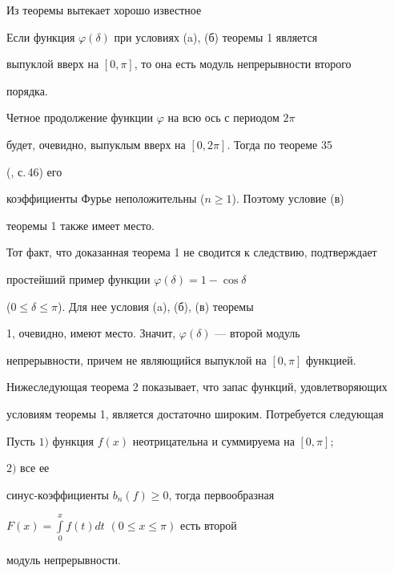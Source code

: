  


Из теоремы вытекает хорошо известное 


 


\begin{cornonum} 


Если функция $\varphi(\delta)$ при условиях (a), (б) теоремы 1 является 


выпуклой вверх на $[0,\pi]$, то она есть модуль непрерывности второго 


порядка. 


\end{cornonum} 


 


\begin{pf} 


Четное продолжение функции $\varphi$ на всю ось с периодом $2\pi$ 


будет, очевидно, выпуклым вверх на $[0,2\pi]$. Тогда по теореме 35 


(\cite{3}, с.\,46) его 


коэффициенты Фурье неположительны ($n\ge 1$). Поэтому условие (в) 


теоремы 1 также имеет место. 


\end{pf} 


 


Тот факт, что доказанная теорема 1 не сводится к следствию, подтверждает 


простейший пример функции $\varphi(\delta)=1-\cos\delta$ 


($0\le\delta\le\pi$). Для нее условия (a), (б), (в) теоремы 


1, очевидно, имеют место. Значит, $\varphi(\delta)$ --- второй модуль 


непрерывности, причем не являющийся выпуклой на $[0,\pi]$ функцией. 


 


Нижеследующая теорема 2 показывает, что запас функций, удовлетворяющих 


условиям теоремы 1, является достаточно широким. Потребуется следующая 


 


\begin{lemnonum} 


Пусть $1)$ функция $f(x)$ неотрицательна и суммируема на $[0,\pi];$ 


$2)$ все ее 


синус-коэффициенты $b_n(f)\ge 0$, тогда первообразная 


$F(x)=\int\limits^x_0 f(t)dt$ $(0\le x\le\pi)$ есть второй 


модуль непрерывности. 


\end{lemnonum} 


